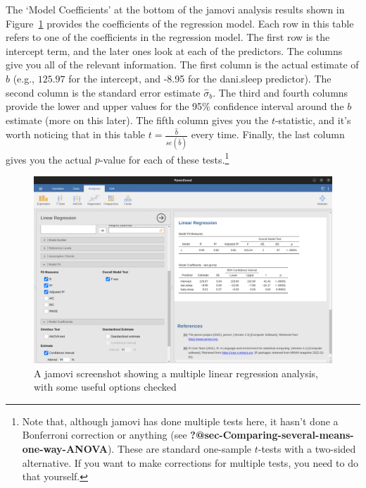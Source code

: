 \documentclass[
  a4paper,
]{book}
\begin{document}
The `Model Coefficients' at the bottom of the jamovi analysis results
shown in Figure~\ref{fig-fig12-15} provides the coefficients of the
regression model. Each row in this table refers to one of the
coefficients in the regression model. The first row is the intercept
term, and the later ones look at each of the predictors. The columns
give you all of the relevant information. The first column is the actual
estimate of \(b\) (e.g., \(125.97\) for the intercept, and -8.95 for the
dani.sleep predictor). The second column is the standard error estimate
\(\hat{\sigma}_b\). The third and fourth columns provide the lower and
upper values for the 95\% confidence interval around the \(b\) estimate
(more on this later). The fifth column gives you the \(t\)-statistic,
and it's worth noticing that in this table
\(t=\frac{\hat{b}} {se({\hat{b}})}\) every time. Finally, the last
column gives you the actual \(p\)-value for each of these
tests.\footnote{Note that, although jamovi has done multiple tests here,
  it hasn't done a Bonferroni correction or anything (see
  \textbf{?@sec-Comparing-several-means-one-way-ANOVA}). These are
  standard one-sample \(t\)-tests with a two-sided alternative. If you
  want to make corrections for multiple tests, you need to do that
  yourself.}

\begin{figure}[H]

\includegraphics[width=1\textwidth,height=\textheight]{images/fig12-15.png} \hfill{}

\caption{\label{fig-fig12-15}A jamovi screenshot showing a multiple
linear regression analysis, with some useful options checked}

\end{figure}
\end{document}
